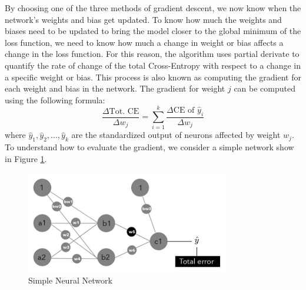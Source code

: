 By choosing one of the three methods of gradient descent, we now know when the network's weights and bias get updated. To know how much the weights and biases need to be updated to bring the model closer to the global minimum of the loss function, we need to know how much a change in weight or bias affects a change in the loss function. For this reason, the algorithm uses partial derivate to quantify the rate of change of the total Cross-Entropy with respect to a change in a specific weight or bias. This process is also known as computing the gradient for each weight and bias in the network. The gradient for weight $j$ can be computed using the following formula:
\[
    \frac{\Delta \text{Tot. CE}}{\Delta w_j}= \sum^k_{i=1}\frac{\Delta \text{CE of }\hat{y}_i}{\Delta w_j}
\]
where $\hat{y}_1, \hat{y}_2, ..., \hat{y}_k$ are the standardized output of neurons affected by weight $w_j$. To understand how to evaluate the gradient, we consider a simple network show in Figure \ref{fig:gradient_nn}.
%
\begin{figure}[H]
    \centering
    \includegraphics[width=3.5in]{figures/simple_nn_gradient.png}
    \caption{Simple Neural Network \cite{taylor2017neural}} \label{fig:gradient_nn}
\end{figure}

